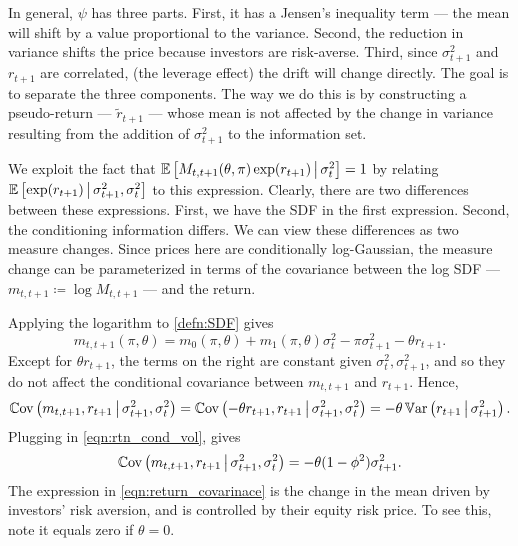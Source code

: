 \documentclass[11pt, letterpaper, twoside]{article}
\begin{document}
In general, $\psi$ has three parts. First, it has a  Jensen's inequality term --- the mean will shift by a value proportional to the variance. Second, the reduction in variance shifts the price because investors are risk-averse. Third, since $\sigma^2_{t+1}$ and $r_{t+1}$ are correlated, (the leverage effect) the drift will change directly. The goal is to separate the three components. The way we do this is by constructing a pseudo-return --- $\widetilde{r}_{t+1}$ --- whose mean is not affected by the change in variance resulting from the addition of  $\sigma^2_{t+1}$ to the information set.

We exploit the fact that $\operatorname{\mathbb{E}}\left[M_{t,t+1}(\theta, \pi) \exp(r_{t+1}) \,\middle\vert\, \sigma^2_t \right] = 1$ by relating $\operatorname{\mathbb{E}}\left[\exp(r_{t+1}) \,\middle\vert\, \sigma^2_{t+1}, \sigma^2_t \right]$ to this expression. Clearly, there are two differences between these expressions. First, we have the SDF in the first expression. Second, the conditioning information differs. We can view these differences as two measure changes. Since prices here are conditionally log-Gaussian, the measure change can be parameterized in terms of the covariance between the log SDF --- $m_{t,t+1} \coloneqq \log M_{t,t+1}$ --- and the return.

Applying the logarithm to \cref{defn:SDF} gives
%
 \begin{equation}
 \label{eqn:log_sdf}
  m_{t,t+1}(\pi, \theta) = m_{0}(\pi, \theta) + m_1(\pi, \theta) \sigma_t^2 - \pi \sigma^2_{t+1} - \theta
  r_{t+1}.
\end{equation}
%
Except for $\theta r_{t+1}$, the terms on the right are constant given $\sigma^2_t, \sigma^2_{t+1}$, and so they do not affect the conditional covariance between $m_{t,t+1}$ and $r_{t+1}$. Hence,
%
\begin{equation}
 \Cov\left(m_{t,t+1}, r_{t+1} \mvert \sigma^2_{t+1}, \sigma^2_t \right) 
%
 = \Cov\left(-\theta r_{t+1}, r_{t+1} \mvert \sigma^2_{t+1}, \sigma^2_t \right) 
%
 = -\theta \Var\left(r_{t+1} \mvert \sigma^2_{t+1}\right). 
\end{equation}
%
Plugging in \cref{eqn:rtn_cond_vol}, gives
%
\begin{equation}
 \label{eqn:return_covarinace}
 \Cov\left(m_{t,t+1}, r_{t+1} \mvert \sigma^2_{t+1}, \sigma^2_t \right) 
%
 = -\theta (1 - \phi^2) \sigma^2_{t+1}.
\end{equation}
%
The expression in \cref{eqn:return_covarinace} is the change in the mean driven by investors' risk aversion, and is controlled by their equity risk price. To see this, note it equals zero if $\theta = 0$.
\end{document}
